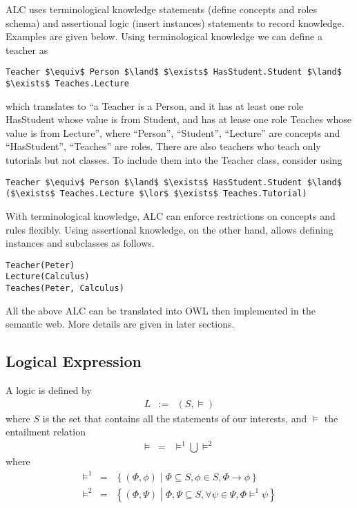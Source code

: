 ALC uses terminological knowledge statements (define concepts and roles schema) and assertional logic (insert instances) statements to record knowledge. Examples are given below. Using terminological knowledge we can define a teacher as
\begin{lstlisting}[mathescape=true]
	Teacher $\equiv$ Person $\land$ $\exists$ HasStudent.Student $\land$ $\exists$ Teaches.Lecture
\end{lstlisting}
which translates to ``a Teacher is a Person, and it has at least one role HasStudent whose value is from Student, and has at lease one role Teaches whose value is from Lecture'', where ``Person'', ``Student'', ``Lecture'' are concepts and ``HasStudent'', ``Teaches'' are roles. There are also teachers who teach only tutorials but not classes. To include them into the Teacher class, consider using
\begin{lstlisting}[mathescape=true]
Teacher $\equiv$ Person $\land$ $\exists$ HasStudent.Student $\land$ ($\exists$ Teaches.Lecture $\lor$ $\exists$ Teaches.Tutorial)
\end{lstlisting}
With terminological knowledge, ALC can enforce restrictions on concepts and rules flexibly. Using assertional knowledge, on the other hand, allows defining instances and subclasses as follows.
\begin{lstlisting}
Teacher(Peter)
Lecture(Calculus)
Teaches(Peter, Calculus)
\end{lstlisting}

All the above ALC can be translated into OWL then implemented in the semantic web. More details are given in later sections.

\subsection{Logical Expression}

A logic is defined by 
\begin{eqnarray}
	L&:=& (S, \models) \nonumber
\end{eqnarray}
where $S$ is the set that contains all the statements of our interests, and $\models$ the entailment relation
\begin{eqnarray}
	\models &=& \models^1 \bigcup \models^2 \nonumber
\end{eqnarray}
where
\begin{eqnarray}
	\models^1 &=& \left\{(\Phi,\phi)\middle| \Phi \subseteq S, \phi\in S, \Phi\rightarrow \phi\right\} \label{eq:logicentailment} \\
	\models^2 &=& \left\{(\Phi, \Psi)\middle| \Phi, \Psi \subseteq S, \forall \psi \in \Psi, \Phi \models^1 \psi \right\} \label{eq:compoundlogicentailment}
\end{eqnarray}

